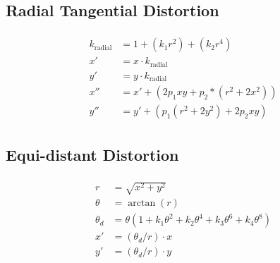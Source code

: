 \documentclass{article}
\begin{document}
\subsection{Radial Tangential Distortion}

\begin{align}
\begin{split}
  k_{\text{radial}} &= 1 + (k_1 r^2) + (k_2 r^4) \\
  x' &= x \cdot k_{\text{radial}} \\
  y' &= y \cdot k_{\text{radial}} \\
  x'' &= x' + (2 p_1 x y + p_2 * (r^2 + 2 x^2)) \\
  y'' &= y' + (p_1 (r^2 + 2 y^2) + 2 p_2 x y)
\end{split}
\end{align}

\subsection{Equi-distant Distortion}

\begin{align}
\begin{split}
  r &= \sqrt{x^{2} + y^{2}} \\
  \theta &= \arctan{(r)} \\
  \theta_d &= \theta (1 + k_1 \theta^2 + k_2 \theta^4 + k_3 \theta^6 + k_4 \theta^8) \\
  x' &= (\theta_d / r) \cdot x \\
  y' &= (\theta_d / r) \cdot y
\end{split}
\end{align}
\end{document}
